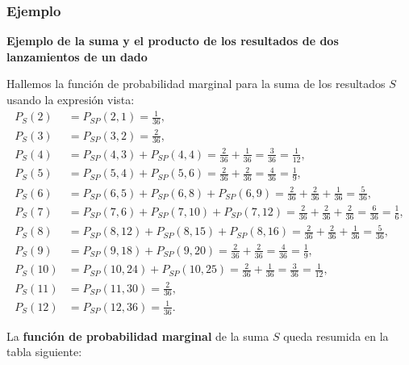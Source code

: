 \documentclass[]{book}
\begin{document}
\hypertarget{ejemplo-2}{%
\subsubsection{Ejemplo}\label{ejemplo-2}}

\textbf{Ejemplo de la suma y el producto de los resultados de dos lanzamientos de un dado}

Hallemos la función de probabilidad marginal para la suma de los resultados \(S\) usando la expresión vista:
\[
\begin{array}{rl}
P_S(2) & = P_{SP}(2,1)=\frac{1}{36},\\
P_S(3) & = P_{SP}(3,2)=\frac{2}{36},\\
P_S(4) & = P_{SP}(4,3)+P_{SP}(4,4)=\frac{2}{36}+\frac{1}{36}=\frac{3}{36}=\frac{1}{12},\\
P_S(5) & = P_{SP}(5,4)+P_{SP}(5,6)=\frac{2}{36}+\frac{2}{36}=\frac{4}{36}=\frac{1}{9},\\
P_S(6) & = P_{SP}(6,5)+P_{SP}(6,8)+P_{SP}(6,9)=\frac{2}{36}+\frac{2}{36}+\frac{1}{36}=\frac{5}{36},\\
P_S(7) & = P_{SP}(7,6)+P_{SP}(7,10)+P_{SP}(7,12)=\frac{2}{36}+\frac{2}{36}+\frac{2}{36}=\frac{6}{36}=\frac{1}{6},\\
P_S(8) & = P_{SP}(8,12)+P_{SP}(8,15)+P_{SP}(8,16)=\frac{2}{36}+\frac{2}{36}+\frac{1}{36}=\frac{5}{36},\\
P_S(9) & = P_{SP}(9,18)+P_{SP}(9,20)=\frac{2}{36}+\frac{2}{36}=\frac{4}{36}=\frac{1}{9},\\
P_S(10) & = P_{SP}(10,24)+P_{SP}(10,25)=\frac{2}{36}+\frac{1}{36}=\frac{3}{36}=\frac{1}{12},\\
P_S(11) & = P_{SP}(11,30)=\frac{2}{36},\\
P_S(12) & = P_{SP}(12,36)=\frac{1}{36}.
\end{array}
\]

La \textbf{función de probabilidad marginal} de la suma \(S\) queda resumida en la tabla siguiente:
\end{document}
